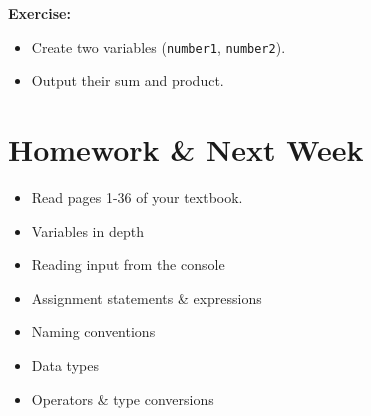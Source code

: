 \documentclass{article}
\begin{document}
\textbf{Exercise:}
\begin{itemize}
    \item Create two variables (\texttt{number1}, \texttt{number2}).
    \item Output their sum and product.
\end{itemize}
\newpage 

\section{Homework \& Next Week}
\begin{itemize}
    \item Read pages 1-36 of your textbook.
    \item Variables in depth
    \item Reading input from the console
    \item Assignment statements \& expressions
    \item Naming conventions
    \item Data types
    \item Operators \& type conversions
\end{itemize}
\end{document}
